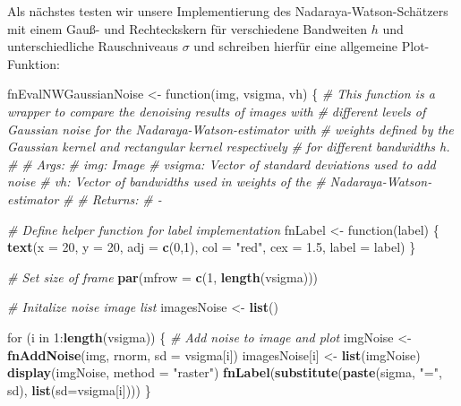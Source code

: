 \documentclass[10pt,]{article}
\newenvironment{Shaded}{\begin{snugshade}}{\end{snugshade}}
\newcommand{\KeywordTok}[1]{\textcolor[rgb]{0.13,0.29,0.53}{\textbf{{#1}}}}
\newcommand{\DataTypeTok}[1]{\textcolor[rgb]{0.13,0.29,0.53}{{#1}}}
\newcommand{\DecValTok}[1]{\textcolor[rgb]{0.00,0.00,0.81}{{#1}}}
\newcommand{\FloatTok}[1]{\textcolor[rgb]{0.00,0.00,0.81}{{#1}}}
\newcommand{\StringTok}[1]{\textcolor[rgb]{0.31,0.60,0.02}{{#1}}}
\newcommand{\CommentTok}[1]{\textcolor[rgb]{0.56,0.35,0.01}{\textit{{#1}}}}
\newcommand{\NormalTok}[1]{{#1}}
\begin{document}
Als nächstes testen wir unsere Implementierung des
Nadaraya-Watson-Schätzers mit einem Gauß- und Rechteckskern für
verschiedene Bandweiten \(h\) und unterschiedliche Rauschniveaus
\(\sigma\) und schreiben hierfür eine allgemeine Plot-Funktion:

\begin{Shaded}
\begin{Highlighting}[]
\NormalTok{fnEvalNWGaussianNoise <-}\StringTok{ }\NormalTok{function(img, vsigma, vh) \{}
  \CommentTok{# This function is a wrapper to compare the denoising results of images with }
  \CommentTok{# different levels of Gaussian noise for the Nadaraya-Watson-estimator with}
  \CommentTok{# weights defined by the Gaussian kernel and rectangular kernel respectively }
  \CommentTok{# for different bandwidths h.}
  \CommentTok{# }
  \CommentTok{# Args:}
  \CommentTok{#   img:    Image}
  \CommentTok{#   vsigma: Vector of standard deviations used to add noise}
  \CommentTok{#   vh:     Vector of bandwidths used in weights of the}
  \CommentTok{#           Nadaraya-Watson-estimator}
  \CommentTok{#   }
  \CommentTok{# Returns:}
  \CommentTok{#   -}
  
  \CommentTok{# Define helper function for label implementation}
  \NormalTok{fnLabel <-}\StringTok{ }\NormalTok{function(label) \{}
    \KeywordTok{text}\NormalTok{(}\DataTypeTok{x =} \DecValTok{20}\NormalTok{, }\DataTypeTok{y =} \DecValTok{20}\NormalTok{, }\DataTypeTok{adj =} \KeywordTok{c}\NormalTok{(}\DecValTok{0}\NormalTok{,}\DecValTok{1}\NormalTok{), }\DataTypeTok{col =} \StringTok{"red"}\NormalTok{, }\DataTypeTok{cex =} \FloatTok{1.5}\NormalTok{, }\DataTypeTok{label =} \NormalTok{label)}
  \NormalTok{\}}
  
  \CommentTok{# Set size of frame}
  \KeywordTok{par}\NormalTok{(}\DataTypeTok{mfrow =} \KeywordTok{c}\NormalTok{(}\DecValTok{1}\NormalTok{, }\KeywordTok{length}\NormalTok{(vsigma)))}
  
  \CommentTok{# Initalize noise image list}
  \NormalTok{imagesNoise <-}\StringTok{ }\KeywordTok{list}\NormalTok{()}
  
  \NormalTok{for (i in }\DecValTok{1}\NormalTok{:}\KeywordTok{length}\NormalTok{(vsigma)) \{}
    \CommentTok{# Add noise to image and plot}
    \NormalTok{imgNoise <-}\StringTok{ }\KeywordTok{fnAddNoise}\NormalTok{(img, rnorm, }\DataTypeTok{sd =} \NormalTok{vsigma[i])}
    \NormalTok{imagesNoise[i] <-}\StringTok{ }\KeywordTok{list}\NormalTok{(imgNoise)}
    \KeywordTok{display}\NormalTok{(imgNoise, }\DataTypeTok{method =} \StringTok{"raster"}\NormalTok{)}
    \KeywordTok{fnLabel}\NormalTok{(}\KeywordTok{substitute}\NormalTok{(}\KeywordTok{paste}\NormalTok{(sigma, }\StringTok{"="}\NormalTok{, sd), }\KeywordTok{list}\NormalTok{(}\DataTypeTok{sd=}\NormalTok{vsigma[i])))}
  \NormalTok{\}}
  

\end{Highlighting}
\end{Shaded}
\end{document}
